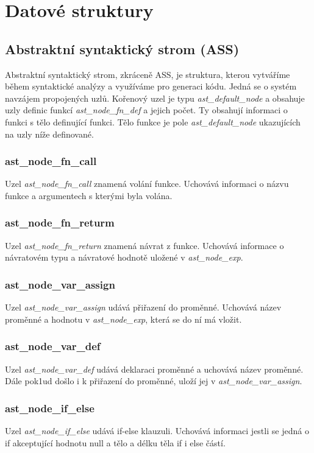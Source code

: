 \documentclass[a4paper, 12pt]{article}
\begin{document}
\newpage
{}
\section{Datové struktury}

\subsection{Abstraktní syntaktický strom (ASS)}
Abstraktní syntaktický strom, zkráceně ASS, je struktura, kterou vytváříme během syntaktické analýzy a využíváme pro generaci kódu. Jedná se o systém navzájem propojených uzlů. Kořenový uzel je typu \textit{ast\_default\_node} a obsahuje uzly definic funkcí \textit{ast\_node\_fn\_def} a jejich počet. Ty obsahují informaci o funkci s tělo definující funkci. Tělo funkce je pole \textit{ast\_default\_node} ukazujících na uzly níže definované. 
\subsubsection{ast\_node\_fn\_call}
Uzel \textit{ast\_node\_fn\_call} znamená volání funkce. Uchovává informaci o názvu funkce a argumentech s kterými byla volána.
\subsubsection{ast\_node\_fn\_returm}
Uzel \textit{ast\_node\_fn\_return} znamená návrat z funkce. Uchovává informace o návratovém typu a návratové hodnotě uložené v \textit{ast\_node\_exp}.
\subsubsection{ast\_node\_var\_assign}
Uzel \textit{ast\_node\_var\_assign} udává přiřazení do proměnné. Uchovává název proměnné a hodnotu v \textit{ast\_node\_exp}, která se do ní má vložit.
\subsubsection{ast\_node\_var\_def}
Uzel \textit{ast\_node\_var\_def} udává deklaraci proměnné a uchovává název proměnné. Dále pok1ud došlo i k přiřazení do proměnné, uloží jej v \textit{ast\_node\_var\_assign}.\
\subsubsection{ast\_node\_if\_else}
Uzel \textit{ast\_node\_if\_else} udává if-else klauzuli. Uchovává informaci jestli se jedná o if akceptující hodnotu null a tělo a délku těla if i else částí. 
\end{document}
